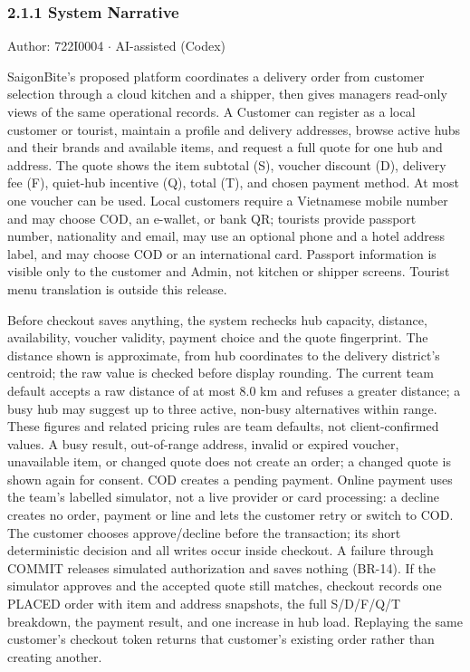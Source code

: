 \subsubsection*{2.1.1 System Narrative}
Author: 722I0004 \ensuremath{\cdot} AI-assisted (Codex)

SaigonBite's proposed platform coordinates a delivery order from customer selection through a cloud kitchen and a shipper, then gives managers read-only views of the same operational records. A Customer can register as a local customer or tourist, maintain a profile and delivery addresses, browse active hubs and their brands and available items, and request a full quote for one hub and address. The quote shows the item subtotal (S), voucher discount (D), delivery fee (F), quiet-hub incentive (Q), total (T), and chosen payment method. At most one voucher can be used. Local customers require a Vietnamese mobile number and may choose COD, an e-wallet, or bank QR; tourists provide passport number, nationality and email, may use an optional phone and a hotel address label, and may choose COD or an international card. Passport information is visible only to the customer and Admin, not kitchen or shipper screens. Tourist menu translation is outside this release.

Before checkout saves anything, the system rechecks hub capacity, distance, availability, voucher validity, payment choice and the quote fingerprint. The distance shown is approximate, from hub coordinates to the delivery district's centroid; the raw value is checked before display rounding. The current team default accepts a raw distance of at most 8.0 km and refuses a greater distance; a busy hub may suggest up to three active, non-busy alternatives within range. These figures and related pricing rules are team defaults, not client-confirmed values. A busy result, out-of-range address, invalid or expired voucher, unavailable item, or changed quote does not create an order; a changed quote is shown again for consent. COD creates a pending payment. Online payment uses the team's labelled simulator, not a live provider or card processing: a decline creates no order, payment or line and lets the customer retry or switch to COD. The customer chooses approve/decline before the transaction; its short deterministic decision and all writes occur inside checkout. A failure through COMMIT releases simulated authorization and saves nothing (BR-14). If the simulator approves and the accepted quote still matches, checkout records one PLACED order with item and address snapshots, the full S/D/F/Q/T breakdown, the payment result, and one increase in hub load. Replaying the same customer's checkout token returns that customer's existing order rather than creating another.

